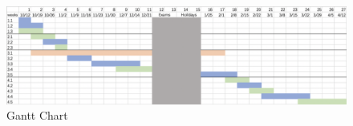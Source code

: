 \documentclass[12pt, a4paper, twoside]{extarticle}
\begin{document}
\begin{figure}[htbp] 
\includegraphics[width=1\columnwidth]{images/timetable.png}
\caption{Gantt Chart}
\label{fig:1} 
\end{figure}

\clearpage
\newpage


\end{document}
